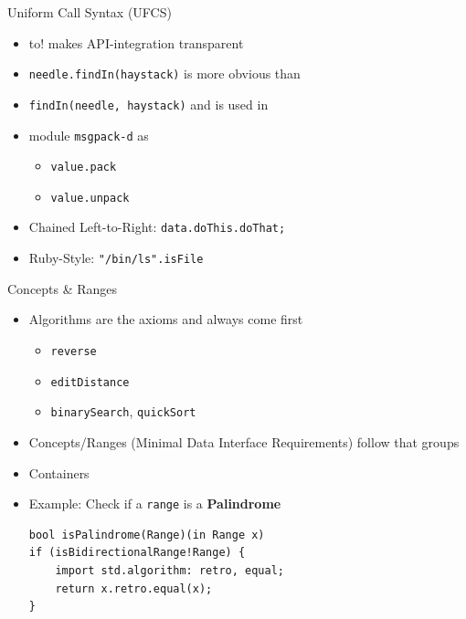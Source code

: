 \documentclass[xcolor=dvipsnames]{beamer}
\begin{document}
\begin{frame}[fragile]{Uniform Call Syntax (UFCS)}
  \begin{itemize}[<+->]
  \item to! makes API-integration transparent
  \item \texttt{needle.findIn(haystack)} is more obvious than
  \item \texttt{findIn(needle, haystack)} and is used in
  \item module \texttt{msgpack-d} as
    \begin{itemize}[<+->]
    \item \texttt{value.pack}
    \item \texttt{value.unpack}
    \end{itemize}
  \item Chained Left-to-Right: \texttt{data.doThis.doThat;}
  \item Ruby-Style: \texttt{"/bin/ls".isFile}
  \end{itemize}
\end{frame}


\begin{frame}[fragile]{Concepts \& Ranges}
    \begin{itemize}[<+->]
    \item Algorithms are the axioms and always come first
      \begin{itemize}[<+->]
      \item \texttt{reverse}
      \item \texttt{editDistance}
      \item \texttt{binarySearch}, \texttt{quickSort}
      \end{itemize}
    \item Concepts/Ranges (Minimal Data Interface Requirements) follow that groups
    \item Containers
    \item Example: Check if a \texttt{range} is a \textbf{Palindrome}
    \begin{lstlisting}[frame=single]
bool isPalindrome(Range)(in Range x)
if (isBidirectionalRange!Range) {
    import std.algorithm: retro, equal;
    return x.retro.equal(x);
}
    \end{lstlisting}
    \end{itemize}
\end{frame}
\end{document}
